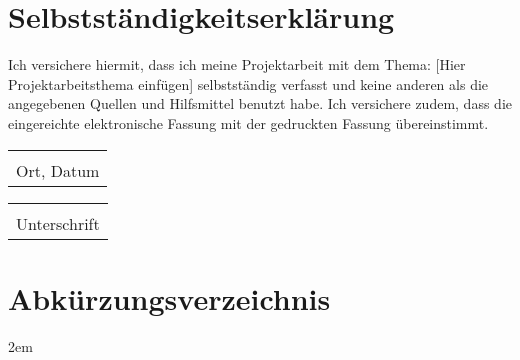 \documentclass[a4paper, 12pt]{article}
\begin{document}
\section*{Selbstständigkeitserklärung}
Ich versichere hiermit, dass ich meine Projektarbeit mit dem Thema: [Hier Projektarbeitsthema einfügen] selbstständig verfasst und keine anderen als die angegebenen Quellen und Hilfsmittel benutzt habe. 
Ich versichere zudem, dass die eingereichte elektronische Fassung mit der gedruckten Fassung übereinstimmt.

\vspace{1.25cm}
\begin{flushleft}
    \begin{minipage}[c]{0.49\textwidth}
        \begin{tabular}{@{}p{2in}@{}}
            \hrulefill \\
            Ort, Datum \\
        \end{tabular}
    \end{minipage}
    \begin{minipage}[c]{0.49\textwidth}
        \begin{tabular}{@{}p{2in}@{}}
            \hrulefill \\
            Unterschrift \\
        \end{tabular}
    \end{minipage}
\end{flushleft}

\pagebreak
\section*{Abkürzungsverzeichnis}
\begin{acronym}
\end{acronym}
\pagebreak
\tableofcontents
\pagebreak
\listoffigures
\renewcommand\listoflistingscaption{Quellcodeverzeichnis}
\listoflistings
\pagebreak

\begin{refsection}
%

\pagebreak
\emergencystretch 2em
\printbibliography
\pagebreak
\end{refsection}

\end{document}
